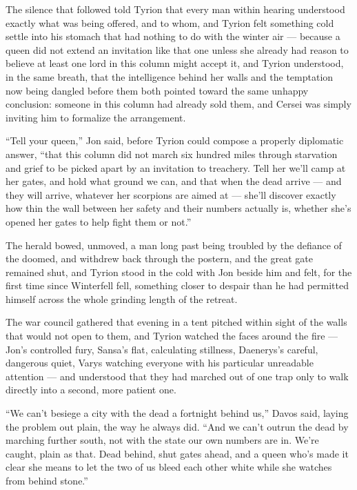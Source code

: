 The silence that followed told Tyrion that every man within hearing understood exactly what was being offered, and to whom, and Tyrion felt something cold settle into his stomach that had nothing to do with the winter air — because a queen did not extend an invitation like that one unless she already had reason to believe at least one lord in this column might accept it, and Tyrion understood, in the same breath, that the intelligence behind her walls and the temptation now being dangled before them both pointed toward the same unhappy conclusion: someone in this column had already sold them, and Cersei was simply inviting him to formalize the arrangement.

“Tell your queen,” Jon said, before Tyrion could compose a properly diplomatic answer, “that this column did not march six hundred miles through starvation and grief to be picked apart by an invitation to treachery. Tell her we’ll camp at her gates, and hold what ground we can, and that when the dead arrive — and they will arrive, whatever her scorpions are aimed at — she’ll discover exactly how thin the wall between her safety and their numbers actually is, whether she’s opened her gates to help fight them or not.”

The herald bowed, unmoved, a man long past being troubled by the defiance of the doomed, and withdrew back through the postern, and the great gate remained shut, and Tyrion stood in the cold with Jon beside him and felt, for the first time since Winterfell fell, something closer to despair than he had permitted himself across the whole grinding length of the retreat.

\sceneBreak

The war council gathered that evening in a tent pitched within sight of the walls that would not open to them, and Tyrion watched the faces around the fire — Jon’s controlled fury, Sansa’s flat, calculating stillness, Daenerys’s careful, dangerous quiet, Varys watching everyone with his particular unreadable attention — and understood that they had marched out of one trap only to walk directly into a second, more patient one.

“We can’t besiege a city with the dead a fortnight behind us,” Davos said, laying the problem out plain, the way he always did. “And we can’t outrun the dead by marching further south, not with the state our own numbers are in. We’re caught, plain as that. Dead behind, shut gates ahead, and a queen who’s made it clear she means to let the two of us bleed each other white while she watches from behind stone.”

